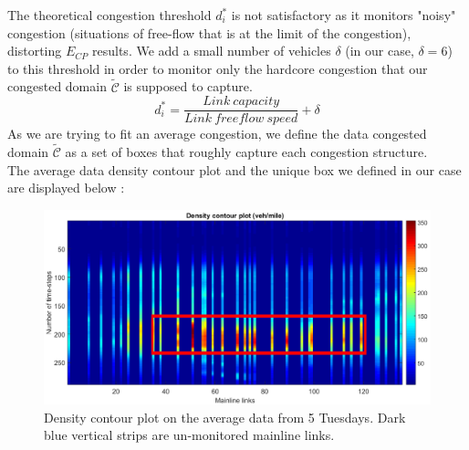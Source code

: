 The theoretical congestion threshold $d_{i}^{*}$ is not satisfactory as it monitors "noisy" congestion (situations of free-flow that is at the limit of the congestion), distorting $E_{CP}$ results. We add a small number of vehicles $\delta$ (in our case, $\delta=6$) to this threshold in order to monitor only the hardcore congestion that our congested domain $\widetilde{\mathscr{C}}$ is supposed to capture.
	\begin{equation*} 
		d_{i}^{*}=\frac{Link\ capacity}{Link\ freeflow\ speed}+\delta
	\end{equation*}
As we are trying to fit an average congestion, we define the data congested domain $\widetilde{\mathscr{C}}$ as a set of boxes that roughly capture each congestion structure.\\
The average data density contour plot and the unique box we defined in our case are displayed below :
\begin{figure}[h!]
	\centering
	\caption{Density contour plot on the average data from 5 Tuesdays. Dark blue vertical strips are un-monitored mainline links.}
	\label{fig:pems_contour}
	\includegraphics[width=7in]{figures/PeMS_contour.png}
\end{figure}
